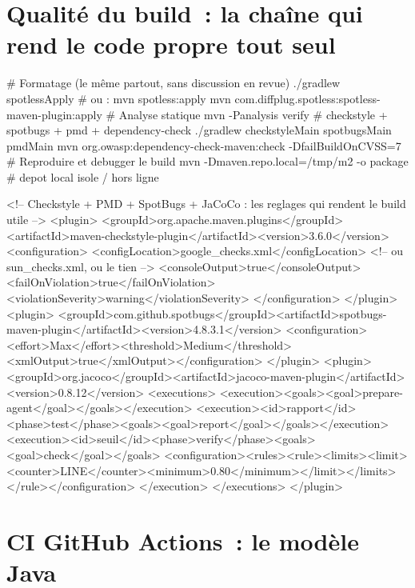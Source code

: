 \section{Qualit\'e du build~: la cha\^ine qui rend le code propre tout seul}

\begin{terminal}
# Formatage (le m\^eme partout, sans discussion en revue)
./gradlew spotlessApply            # ou : mvn spotless:apply
mvn com.diffplug.spotless:spotless-maven-plugin:apply
# Analyse statique
mvn -Panalysis verify              # checkstyle + spotbugs + pmd + dependency-check
./gradlew checkstyleMain spotbugsMain pmdMain
mvn org.owasp:dependency-check-maven:check -DfailBuildOnCVSS=7
# Reproduire et debugger le build
mvn -Dmaven.repo.local=/tmp/m2 -o package      # depot local isole / hors ligne
\end{terminal}

\begin{codeconf}
<!-- Checkstyle + PMD + SpotBugs + JaCoCo : les reglages qui rendent le build utile -->
<plugin>
  <groupId>org.apache.maven.plugins</groupId><artifactId>maven-checkstyle-plugin</artifactId><version>3.6.0</version>
  <configuration>
    <configLocation>google_checks.xml</configLocation>       <!-- ou sun_checks.xml, ou le tien -->
    <consoleOutput>true</consoleOutput><failOnViolation>true</failOnViolation>
    <violationSeverity>warning</violationSeverity>
  </configuration>
</plugin>
<plugin>
  <groupId>com.github.spotbugs</groupId><artifactId>spotbugs-maven-plugin</artifactId><version>4.8.3.1</version>
  <configuration><effort>Max</effort><threshold>Medium</threshold><xmlOutput>true</xmlOutput></configuration>
</plugin>
<plugin>
  <groupId>org.jacoco</groupId><artifactId>jacoco-maven-plugin</artifactId><version>0.8.12</version>
  <executions>
    <execution><goals><goal>prepare-agent</goal></goals></execution>
    <execution><id>rapport</id><phase>test</phase><goals><goal>report</goal></goals></execution>
    <execution><id>seuil</id><phase>verify</phase><goals><goal>check</goal></goals>
      <configuration><rules><rule><limits><limit><counter>LINE</counter><minimum>0.80</minimum></limit></limits></rule></configuration>
    </execution>
  </executions>
</plugin>
\end{codeconf}

\section{CI GitHub Actions~: le mod\`ele Java}

